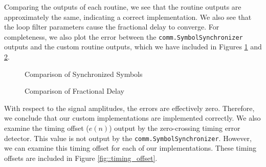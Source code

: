 \documentclass{article}
\begin{document}
\noindent Comparing the outputs of each routine, we see that the routine outputs are approximately the same, indicating a correct implementation. We also see that the loop filter parameters cause the fractional delay to converge. For completeness, we also plot the error between the \texttt{comm.SymbolSynchronizer} outputs and the custom routine outputs, which we have included in Figures \ref{fig::symbol_sync_error} and \ref{fig::fractional_delay_error}.

\begin{figure}[H]
	\centerline{}
	\caption{Comparison of Synchronized Symbols}
	\label{fig::symbol_sync_error}
\end{figure}

\begin{figure}[H]
	\centerline{}
	\caption{Comparison of Fractional Delay}
	\label{fig::fractional_delay_error}
\end{figure}

\noindent With respect to the signal amplitudes, the errors are effectively zero. Therefore, we conclude that our custom implementations are implemented correctly. We also examine the timing offset ($e(n)$) output by the zero-crossing timing error detector. This value is not output by the \texttt{comm.SymbolSynchronizer}. However, we can examine this timing offset for each of our implementations. These timing offsets are included in Figure \ref{fig::timing_offset}. 
\end{document}
